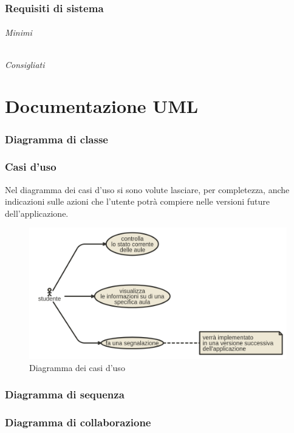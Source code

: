 \documentclass{article}
\begin{document}
	\section{Requisiti di sistema}
	\paragraph{Minimi}
	\paragraph{Consigliati}
	\newpage
	\part{Documentazione UML}
	\section{Diagramma di classe}
	\newpage
	\section{Casi d'uso}
	Nel diagramma dei casi d'uso si sono volute lasciare, per completezza, anche indicazioni sulle azioni che l'utente potrà compiere nelle versioni future dell'applicazione.\\
	\begin{figure}[h]
		\includegraphics[scale=0.40]{casiduso}
		\centering
		\caption{Diagramma dei casi d'uso}
	\end{figure}
	\newpage
	\section{Diagramma di sequenza}
	\newpage
	\section{Diagramma di collaborazione}
	\newpage
\end{document}
